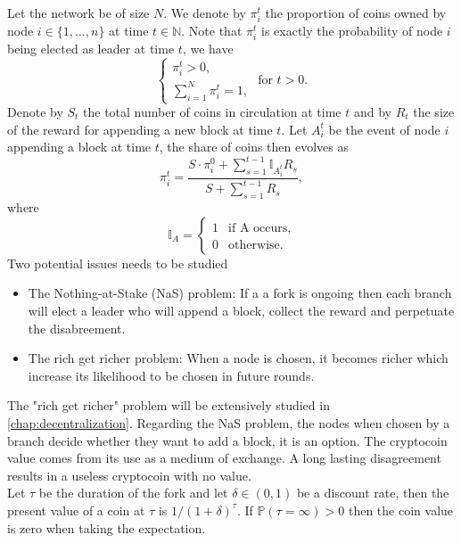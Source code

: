 \noindent Let the network be of size $N$. We denote by $\pi_i^t$ the proportion of coins owned by node $i\in\{1,\ldots,n\}$ at time $t\in\mathbb{N}$. Note that $\pi_i^t$ is exactly the probability of node $i$ being elected as leader at time $t$, we have
$$
\begin{cases}
\pi_i^t>0,\\
\sum_{i=1}^N\pi_i^t = 1,
\end{cases}
\text{ for } t>0.
$$
Denote by $S_t$ the total number of coins in circulation at time $t$ and by $R_t$ the size of the reward for appending a new block at time $t$. Let $A_i^t$ be the event of node $i$ appending a block at time $t$, the share of coins then evolves as
$$
\pi_i^t = \frac{S\cdot \pi_i^0 + \sum_{s=1}^{t-1}\mathbb{I}_{A_i^t}R_s}{S+\sum_{s=1}^{t-1}R_s},
$$
where 
$$
\mathbb{I}_{A} = \begin{cases}1& \text{if A occurs},\\
0&\text{otherwise}.
\end{cases}
$$
Two potential issues needs to be studied
\begin{itemize}
    \item The Nothing-at-Stake (NaS) problem: If a a fork is ongoing then each branch will elect a leader who will append a block, collect the reward and perpetuate the disabreement.
    \item The rich get richer problem: When a node is chosen, it becomes richer which increase its likelihood to be chosen in future rounds.
\end{itemize}
The "rich get richer" problem will be extensively studied in \cref{chap:decentralization}. Regarding the NaS problem, the nodes when chosen by a branch decide whether they want to add a block, it is an option. The cryptocoin value comes from its use as a medium of exchange. A long lasting disagreement results in a useless cryptocoin with no value.\\

\noindent Let $\tau$ be the duration of the fork and let $\delta\in(0,1)$ be a discount rate, then the present value of a coin at $\tau$ is $1/(1+\delta)^\tau$. If $\mathbb{P}(\tau=\infty)>0$ then the coin value is zero when taking the expectation.\\

